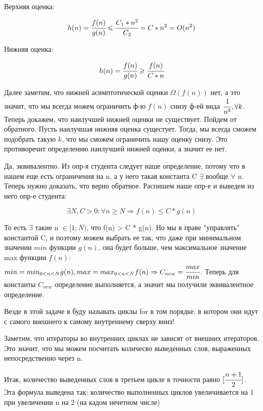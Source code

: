 \documentclass[12pt]{extreport}
\theoremstyle{definition}
\theoremstyle{definition}
\let\leq\leqslant
\let\geq\geqslant
\newcounter{problem}
\newcounter{subproblem}
\def\PRSUBskip{
	\medskip
}
\def\prsub{\PRSUBskip\noindent\stepcounter{subproblem}{\sf \thesubproblem .} }
\begin{document}
\medskip

\prsub Верхняя оценка: 

$$ h(n) = \cfrac{f(n)}{g(n)} \leq \cfrac{C_1*n^2}{C_2} = C*n^2 = O(n^2) $$

\hspace{4mm} Нижняя оценка:

$$ h(n) = \cfrac{f(n)}{g(n)} \geq \cfrac{f(n)}{C*n} $$

\hspace{4mm} Далее заметим, что нижней асимптотической оценки $\Omega(f(n))$ нет, а это значит, что мы всегда можем ограничить ф-ю $f(n)$ снизу ф-ей вида $\cfrac{1}{n^k}, \forall k$. Теперь докажем, что наилучшей нижней оценки не существует. Пойдем от обратного. Пусть наилучшая нижняя оценка сущестует. Тогда, мы всегда сможем подобрать такую $k$, что мы сможем ограничить нашу оценку снизу. Это противоречит определению наилучшей нижней оценки, а значит ее нет.

\Pr \hspace{1mm} Да, эквивалентно. Из опр-я студента следует наше определение, потому что в нашем еще есть ограничения на n, а у него такая константа C $\exists$ вообще $\forall$ n. Теперь нужно доказать, что верно обратное. Распишем наше опр-е и выведем из него опр-е студента: 

$$ \exists N, C > 0 : \forall n \geq N \Rightarrow f(n) \leq C * g(n) $$

\hspace{4mm} То есть $\exists$ такие n $\in [1;N) $, что f(n) > C * g(n). Но мы в праве "управлять"  константой C, и поэтому можем выбрать ее так, что даже при минимальном значении $min$ функции $g(n)$, она будет больше, чем максимальное значение max функции $f(n)$: $min = min_{0<n<N}g(n), max = max_{0<n<N}f(n) \Rightarrow C_{new} = \cfrac{max}{min}$. Теперь для константы $C_{new}$ определение выполняется, а значит мы получили эквивалентное определение. 

\Pr \hspace{1mm} Везде в этой задаче я буду называть циклы for в том порядке, в котором они идут с самого внешнего к самому внутреннему сверху вниз!

\hspace{4mm} \prsub Заметим, что итераторы во внутренних циклах не зависят от внешних итераторов. Это значит, что мы можем посчитать количесво выведенных слов, выраженных непосредственно через n.

\hspace{4mm} \prsub Итак, количество выведенных слов в третьем цикле в точности равно $[\cfrac{n+1}{2}]$. Эта формула выведена так: количество выполненных циклов увеличивается на 1 при увеличении n на 2 (на кадом нечетном числе)
\end{document}
